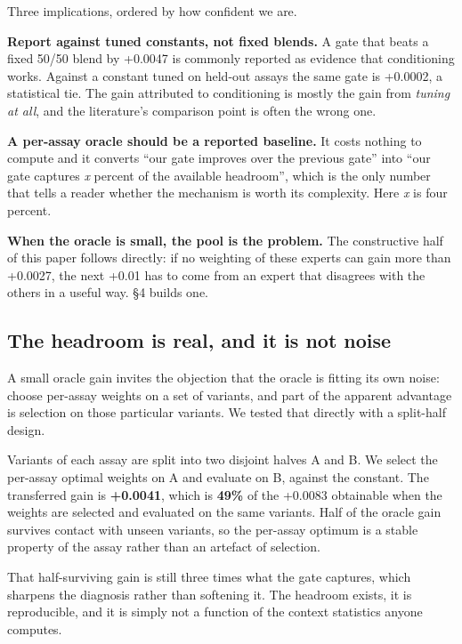 \documentclass[sigconf,review,nonacm]{acmart}
\begin{document}
Three implications, ordered by how confident we are.

\textbf{Report against tuned constants, not fixed blends.} A gate that beats a fixed 50/50 blend by +0.0047
is commonly reported as evidence that conditioning works. Against a constant tuned on held-out assays
the same gate is +0.0002, a statistical tie. The gain attributed to conditioning is mostly the gain from
\emph{tuning at all}, and the literature's comparison point is often the wrong one.

\textbf{A per-assay oracle should be a reported baseline.} It costs nothing to compute and it converts ``our
gate improves over the previous gate'' into ``our gate captures \emph{x} percent of the available headroom'',
which is the only number that tells a reader whether the mechanism is worth its complexity. Here \emph{x} is
four percent.

\textbf{When the oracle is small, the pool is the problem.} The constructive half of this paper follows
directly: if no weighting of these experts can gain more than +0.0027, the next +0.01 has to come from
an expert that disagrees with the others in a useful way. §4 builds one.

\subsection{The headroom is real, and it is not noise}\label{the-headroom-is-real-and-it-is-not-noise}

A small oracle gain invites the objection that the oracle is fitting its own noise: choose per-assay
weights on a set of variants, and part of the apparent advantage is selection on those particular
variants. We tested that directly with a split-half design.

Variants of each assay are split into two disjoint halves A and B. We select the per-assay optimal
weights on A and evaluate on B, against the constant. The transferred gain is \textbf{+0.0041}, which is
\textbf{49\%} of the +0.0083 obtainable when the weights are selected and evaluated on the same variants.
Half of the oracle gain survives contact with unseen variants, so the per-assay optimum is a stable
property of the assay rather than an artefact of selection.

That half-surviving gain is still three times what the gate captures, which sharpens the diagnosis
rather than softening it. The headroom exists, it is reproducible, and it is simply not a function of
the context statistics anyone computes.
\end{document}
